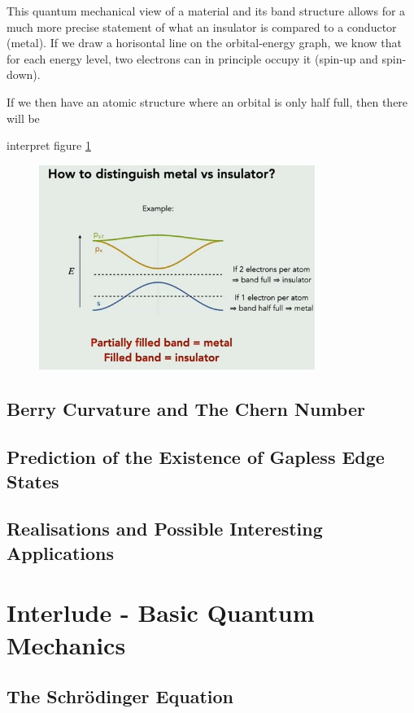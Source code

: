 \documentclass[a4paper]{article}
\begin{document}
    This quantum mechanical view of a material and its band structure allows for a much more precise statement of what an insulator is compared to a conductor (metal). If we draw a horisontal line on the orbital-energy graph, we know that for each energy level, two electrons can in principle occupy it (spin-up and spin-down). 
    
    If we then have an atomic structure where an orbital is only half full, then there will be 

    interpret figure \ref{fig:metal-vs-insulator}

    \begin{figure}[H]
        \centering
        \includegraphics[width=0.8\textwidth]{metal-vs-insulator.png}
        \caption{}
        \label{fig:metal-vs-insulator}
    \end{figure}




    \subsection{Berry Curvature and The Chern Number}
    \subsection{Prediction of the Existence of Gapless Edge States}
    \subsection{Realisations and Possible Interesting Applications}
    \section{Interlude - Basic Quantum Mechanics}
    \subsection{The Schrödinger Equation}
\end{document}
